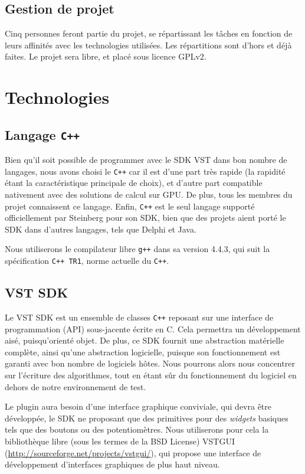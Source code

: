 		\subsection{Gestion de projet}
			Cinq personnes feront partie du projet, se répartissant les tâches en fonction de leurs affinités avec les technologies utilisées. Les répartitions sont d'hors et déjà faites.
			Le projet sera libre, et placé sous licence GPLv2.

	\section{Technologies}
		\subsection{Langage {\tt C++}}
			Bien qu'il soit possible de programmer avec le SDK VST dans bon nombre de langages, nous avons choisi le {\tt C++} car il est d'une part très rapide (la rapidité étant la caractéristique principale de choix), et d'autre part compatible nativement avec des solutions de calcul sur GPU. De plus, tous les membres du projet connaissent ce langage. Enfin, {\tt C++} est le seul langage supporté officiellement par Steinberg pour son SDK, bien que des projets aient porté le SDK dans d'autres langages, tels que Delphi et Java.

			Nous utiliserons le compilateur libre {\tt g++} dans sa version 4.4.3, qui suit la spécification {\tt C++ TR1}, norme actuelle du {\tt C++}.

		\subsection{VST SDK}
			Le VST SDK est un ensemble de classes {\tt C++} reposant sur une interface de programmation (API) sous-jacente écrite en C. Cela permettra un développement aisé, puisqu'orienté objet. De plus, ce SDK fournit une abstraction matérielle complète, ainsi qu'une abstraction logicielle, puisque son fonctionnement est garanti avec bon nombre de logiciels hôtes. Nous pourrons alors nous concentrer sur l'écriture des algorithmes, tout en étant sûr du fonctionnement du logiciel en dehors de notre environnement de test.

			Le plugin aura besoin d'une interface graphique conviviale, qui devra être développée, le SDK ne proposant que des primitives pour des \emph{widgets} basiques tels que des boutons ou des potentiomètres. Nous utiliserons pour cela la bibliothèque libre (sous les termes de la BSD License) VSTGUI (\url{http://sourceforge.net/projects/vstgui/}), qui propose une interface de développement d'interfaces graphiques de plus haut niveau.


